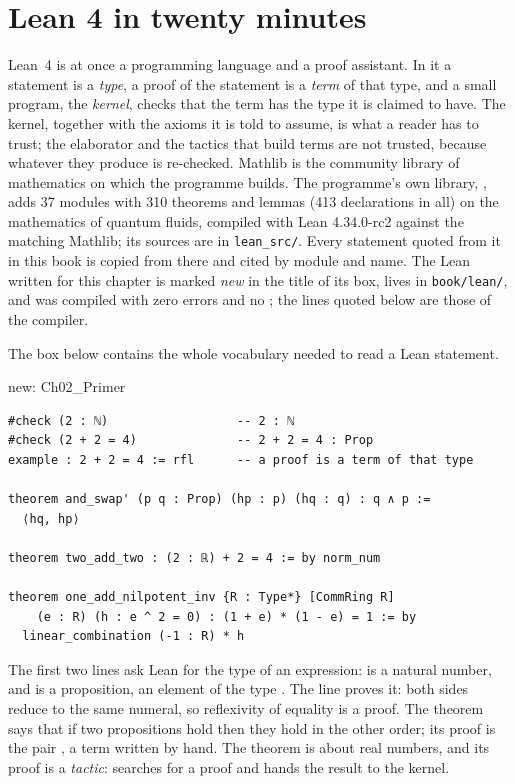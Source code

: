 \section{Lean 4 in twenty minutes}\label{ch02:lean}

Lean~4 \cite{deMoura2021} is at once a programming language and a proof assistant. In it a statement is a \emph{type}, a proof of the statement is a
\emph{term} of that type, and a small program, the \emph{kernel}, checks that the term has the type it is claimed to have. The kernel, together with the axioms
it is told to assume, is what a reader has to trust; the elaborator and the tactics that build terms are not trusted, because whatever they produce is
re-checked. Mathlib \cite{Mathlib2020} is the community library of mathematics on which the programme builds. The programme's own library, ,
adds 37 modules with 310 theorems and lemmas (413 declarations in all) on the mathematics of quantum fluids, compiled with Lean 4.34.0-rc2 against the matching
Mathlib; its sources are in \texttt{lean\_src/}. Every statement quoted from it in this book is copied from there and cited by module and name.
The Lean written for this chapter is marked \emph{new} in the title of its box, lives in \texttt{book/lean/}, and was compiled with zero errors and no ;
the  lines quoted below are those of the compiler.

The box below contains the whole vocabulary needed to read a Lean statement.

\begin{leanbox}{new: Ch02\_Primer}
\begin{lstlisting}[style=lean]
#check (2 : ℕ)                  -- 2 : ℕ
#check (2 + 2 = 4)              -- 2 + 2 = 4 : Prop
example : 2 + 2 = 4 := rfl      -- a proof is a term of that type

theorem and_swap' (p q : Prop) (hp : p) (hq : q) : q ∧ p :=
  ⟨hq, hp⟩

theorem two_add_two : (2 : ℝ) + 2 = 4 := by norm_num

theorem one_add_nilpotent_inv {R : Type*} [CommRing R]
    (e : R) (h : e ^ 2 = 0) : (1 + e) * (1 - e) = 1 := by
  linear_combination (-1 : R) * h
\end{lstlisting}
\end{leanbox}

The first two lines ask Lean for the type of an expression:  is a natural number, and  is a proposition, an element of the type .
The line  proves it: both sides reduce to the same numeral, so reflexivity of equality is a proof. The theorem  says
that if two propositions hold then they hold in the other order; its proof is the pair , a term written by hand. The theorem
 is about real numbers, and its proof is a \emph{tactic}:  searches for a proof and hands the result to the kernel.

